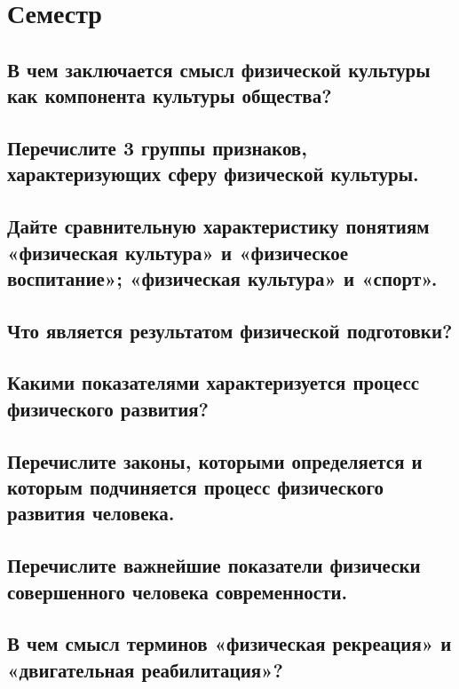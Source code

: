 \section{Семестр}

\subsection{В чем заключается смысл физической культуры как компонента культуры общества?}



\subsection{Перечислите 3 группы признаков, характеризующих сферу физической культуры.}



\subsection{Дайте сравнительную характеристику понятиям «физическая культура» и «физическое воспитание»; «физическая культура» и «спорт».}



\subsection{Что является результатом физической подготовки?}



\subsection{Какими показателями характеризуется процесс физического развития?}



\subsection{Перечислите законы, которыми определяется и которым подчиняется процесс физического развития человека.}



\subsection{Перечислите важнейшие показатели физически совершенного человека современности.}



\subsection{В чем смысл терминов «физическая рекреация» и «двигательная реабилитация»?}



